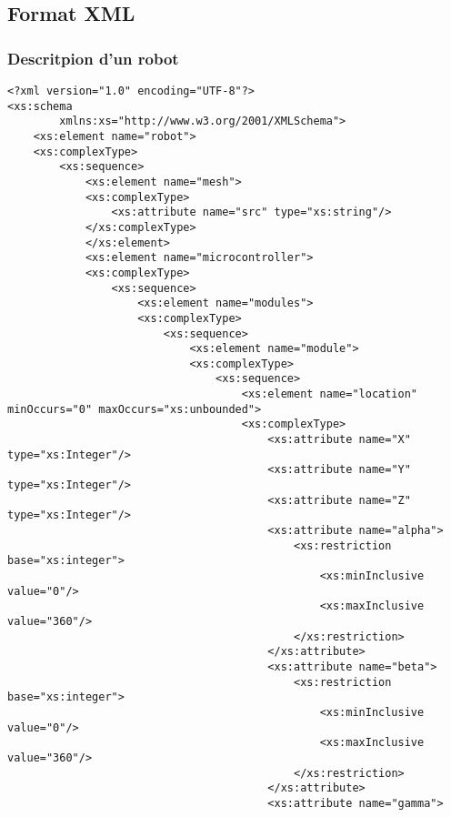 \subsection{Format XML}
\subsubsection{Descritpion d'un robot}
\begin{changemargin}{-1cm}{-1cm}
\begin{lstlisting}[caption=Description du Robot, label=descbot]
<?xml version="1.0" encoding="UTF-8"?>
<xs:schema
        xmlns:xs="http://www.w3.org/2001/XMLSchema">
    <xs:element name="robot">
    <xs:complexType>
        <xs:sequence>
            <xs:element name="mesh">
            <xs:complexType>
                <xs:attribute name="src" type="xs:string"/>
            </xs:complexType>
            </xs:element>
            <xs:element name="microcontroller">
            <xs:complexType>
                <xs:sequence>
                    <xs:element name="modules">
                    <xs:complexType>
                        <xs:sequence>
                            <xs:element name="module">
                            <xs:complexType>
                                <xs:sequence>
                                    <xs:element name="location" minOccurs="0" maxOccurs="xs:unbounded">
                                    <xs:complexType>
                                        <xs:attribute name="X" type="xs:Integer"/>
                                        <xs:attribute name="Y" type="xs:Integer"/>
                                        <xs:attribute name="Z" type="xs:Integer"/>
                                        <xs:attribute name="alpha">
                                            <xs:restriction base="xs:integer">
                                                <xs:minInclusive value="0"/>
                                                <xs:maxInclusive value="360"/>
                                            </xs:restriction> 
                                        </xs:attribute>
                                        <xs:attribute name="beta">
                                            <xs:restriction base="xs:integer">
                                                <xs:minInclusive value="0"/>
                                                <xs:maxInclusive value="360"/>
                                            </xs:restriction>
                                        </xs:attribute>
                                        <xs:attribute name="gamma">

\end{lstlisting}
\end{changemargin}
